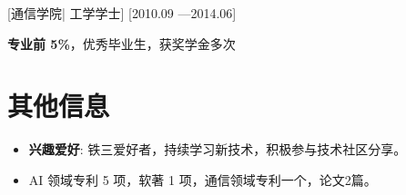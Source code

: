 \documentclass{resume}
\begin{document}
\nocite{*} %



[\textnormal{通信学院|} 工学学士]
[2010.09 —2014.06]

\textbf{专业前 5\%}，优秀毕业生，获奖学金多次

\section{其他信息}
\begin{itemize}
    \item \textbf{兴趣爱好}: 铁三爱好者，持续学习新技术，积极参与技术社区分享。
    \item AI 领域专利 5 项，软著 1 项，通信领域专利一个，论文2篇。
    \printbibliography[heading={none}]
\end{itemize}
\end{document}
